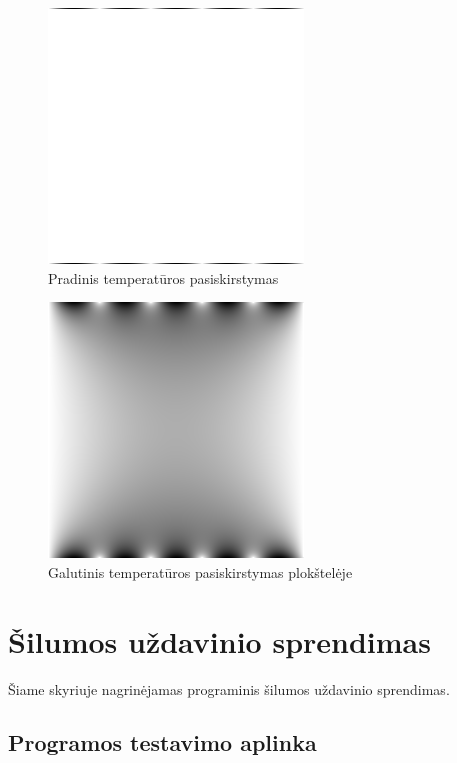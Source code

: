 \documentclass{VUMIFPSbakalaurinis}
\begin{document}
\begin{figure}[H]
    \centering
    \includegraphics[scale=0.7]{img/image_0000000.png}
    \caption{Pradinis temperatūros pasiskirstymas}
    \label{img:start}
\end{figure}

\begin{figure}[H]
    \centering
    \includegraphics[scale=0.7]{img/image_1000000.png}
    \caption{Galutinis temperatūros pasiskirstymas plokštelėje}
    \label{img:end}
\end{figure}

\section{Šilumos uždavinio sprendimas}

Šiame skyriuje nagrinėjamas programinis šilumos uždavinio sprendimas.


\subsection{Programos testavimo aplinka}
\end{document}
